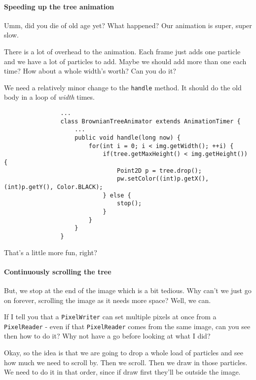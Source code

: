 \documentclass{article}
\begin{document}
        \newpage
        \paragraph{Speeding up the tree animation}
            Umm, did you die of old age yet?  What happened? Our animation is super, super slow.
            
            There is a lot of overhead to the animation. Each frame just adds one particle and we have a lot of particles to add. Maybe we
            should add more than one each time? How about a whole width's worth?  Can you do it?
            
            We need a relatively minor change to the \texttt{handle} method.  It should do the old body in a loop of \emph{width} times.
            
            \begin{verbatim}
                ...            
                class BrownianTreeAnimator extends AnimationTimer {
                    ...
                    public void handle(long now) {
                        for(int i = 0; i < img.getWidth(); ++i) {
                            if(tree.getMaxHeight() < img.getHeight()) {
                                Point2D p = tree.drop();
                                pw.setColor((int)p.getX(), (int)p.getY(), Color.BLACK);
                            } else {
                                stop();
                            }
                        }
                    }
                }
            \end{verbatim}
            
            That's a little more fun, right?
        
        \newpage
        \paragraph{Continuously scrolling the tree}
            But, we stop at the end of the image which is a bit tedious. Why can't we just go on forever, scrolling the image as it needs
            more space? Well, we can.
            
            If I tell you that a \texttt{PixelWriter} can set multiple pixels at once from a \texttt{PixelReader} - even if that
            \texttt{PixelReader} comes from the same image, can you see then how to do it? Why not have a go before looking at what I did?
            
            
            Okay, so the idea is that we are going to drop a whole load of particles and see how much we need to scroll by. Then we scroll.
            Then we draw in those particles. We need to do it in that order, since if draw first they'll be outside the image.
            
\end{document}

